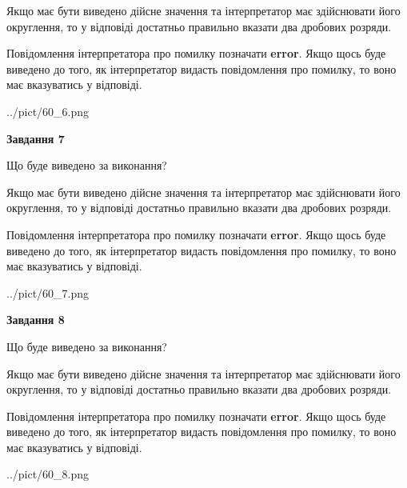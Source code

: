 \documentclass[12pt, ukrainian]{article}
\begin{document}
{\begin {Large}
Якщо має бути виведено дійсне значення та інтерпретатор має здійснювати його округлення, 
то у відповіді достатньо правильно вказати два дробових розряди.

Повідомлення інтерпретатора про помилку позначати \textbf{error}.
Якщо щось буде виведено до того, як інтерпретатор видасть повідомлення про помилку, 
то воно має вказуватись у відповіді. \par

\begin{center}
	{../pict/60_6.png}
\end{center}
\newpage

{\begin {center}\textbf{Завдання 7}\end {center}}\par
Що буде виведено за виконання? \par

Якщо має бути виведено дійсне значення та інтерпретатор має здійснювати його округлення, 
то у відповіді достатньо правильно вказати два дробових розряди.

Повідомлення інтерпретатора про помилку позначати \textbf{error}.
Якщо щось буде виведено до того, як інтерпретатор видасть повідомлення про помилку, 
то воно має вказуватись у відповіді. \par

\begin{center}
	{../pict/60_7.png}
\end{center}
\newpage

{\begin {center}\textbf{Завдання 8}\end {center}}\par
Що буде виведено за виконання? \par

Якщо має бути виведено дійсне значення та інтерпретатор має здійснювати його округлення, 
то у відповіді достатньо правильно вказати два дробових розряди.

Повідомлення інтерпретатора про помилку позначати \textbf{error}.
Якщо щось буде виведено до того, як інтерпретатор видасть повідомлення про помилку, 
то воно має вказуватись у відповіді. \par

\begin{center}
	{../pict/60_8.png}
\end{center}
\newpage


\end{Large}}
\end{document}
